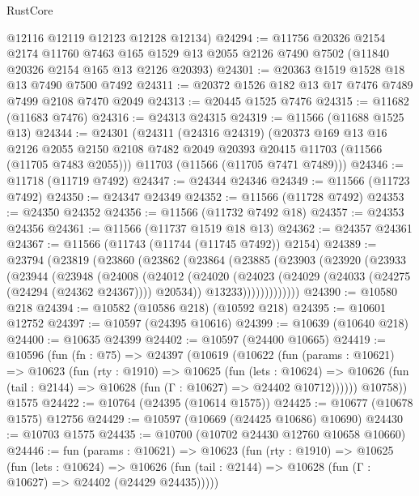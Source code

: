 \begin{lexlean}{RustCore}
\begin{coremodule}
      @12116
      @12119
      @12123
      @12128
      @12134)
@24294 := @11756
    @20326
    @2154
    @2174
    @11760
    @7463
    @165
    @1529
    @13
    @2055
    @2126
    @7490
    @7502
    (@11840 @20326 @2154 @165 @13 @2126 @20393)
@24301 := @20363 @1519 @1528 @18 @13 @7490 @7500 @7492
@24311 := @20372 @1526 @182 @13 @17 @7476 @7489 @7499 @2108 @7470 @2049
@24313 := @20445 @1525 @7476
@24315 := @11682 (@11683 @7476)
@24316 := @24313 @24315
@24319 := @11566 (@11688 @1525 @13)
@24344 := @24301
    (@24311
      (@24316 @24319)
      (@20373
        @169
        @13
        @16
        @2126
        @2055
        @2150
        @2108
        @7482
        @2049
        @20393
        @20415
        @11703
        (@11566 (@11705 @7483 @2055)))
      @11703
      (@11566 (@11705 @7471 @7489)))
@24346 := @11718 (@11719 @7492)
@24347 := @24344 @24346
@24349 := @11566 (@11723 @7492)
@24350 := @24347 @24349
@24352 := @11566 (@11728 @7492)
@24353 := @24350 @24352
@24356 := @11566 (@11732 @7492 @18)
@24357 := @24353 @24356
@24361 := @11566 (@11737 @1519 @18 @13)
@24362 := @24357 @24361
@24367 := @11566 (@11743 (@11744 (@11745 @7492)) @2154)
@24389 := @23794
    (@23819
      (@23860
        (@23862
          (@23864
            (@23885
              (@23903
                (@23920
                  (@23933
                    (@23944
                      (@23948
                        (@24008
                          (@24012
                            (@24020
                              (@24023 (@24029 (@24033 (@24275 (@24294 (@24362 @24367)))) @20534))
                              @13233)))))))))))))
@24390 := @10580 @218
@24394 := @10582 (@10586 @218) (@10592 @218)
@24395 := @10601 @12752
@24397 := @10597 (@24395 @10616)
@24399 := @10639 (@10640 @218)
@24400 := @10635 @24399
@24402 := @10597 (@24400 @10665)
@24419 := @10596
    (fun (fn : @75) =>
    @24397
      (@10619
        (@10622
          (fun (params : @10621) =>
          @10623
            (fun (rty : @1910) =>
            @10625
              (fun (lets : @10624) =>
              @10626 (fun (tail : @2144) => @10628 (fun (Γ : @10627) => @24402 @10712))))))
        @10758))
    @1575
@24422 := @10764 (@24395 (@10614 @1575))
@24425 := @10677 (@10678 @1575) @12756
@24429 := @10597 (@10669 (@24425 @10686) @10690)
@24430 := @10703 @1575
@24435 := @10700 (@10702 @24430 @12760 @10658 @10660)
@24446 := fun (params : @10621) =>
  @10623
    (fun (rty : @1910) =>
    @10625
      (fun (lets : @10624) =>
      @10626 (fun (tail : @2144) => @10628 (fun (Γ : @10627) => @24402 (@24429 @24435)))))

\end{coremodule}
\end{lexlean}
